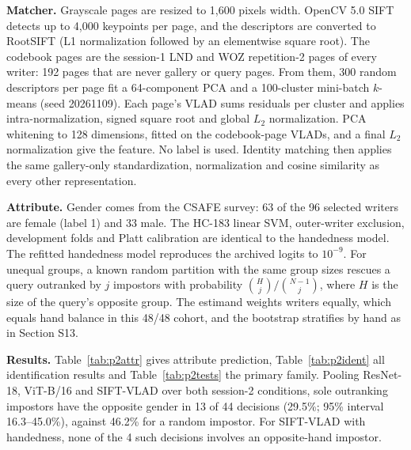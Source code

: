 \documentclass[10pt,a4paper]{article}
\begin{document}
\textbf{Matcher.} Grayscale pages are resized to 1,600 pixels width. OpenCV 5.0 SIFT detects up to 4,000 keypoints per page, and the descriptors are converted to RootSIFT (L1 normalization followed by an elementwise square root). The codebook pages are the session-1 LND and WOZ repetition-2 pages of every writer: 192 pages that are never gallery or query pages. From them, 300 random descriptors per page fit a 64-component PCA and a 100-cluster mini-batch $k$-means (seed 20261109). Each page's VLAD sums residuals per cluster and applies intra-normalization, signed square root and global $L_2$ normalization. PCA whitening to 128 dimensions, fitted on the codebook-page VLADs, and a final $L_2$ normalization give the feature. No label is used. Identity matching then applies the same gallery-only standardization, normalization and cosine similarity as every other representation.

\textbf{Attribute.} Gender comes from the CSAFE survey: 63 of the 96 selected writers are female (label 1) and 33 male. The HC-183 linear SVM, outer-writer exclusion, development folds and Platt calibration are identical to the handedness model. The refitted handedness model reproduces the archived logits to $10^{-9}$. For unequal groups, a known random partition with the same group sizes rescues a query outranked by $j$ impostors with probability $\binom{H}{j}/\binom{N-1}{j}$, where $H$ is the size of the query's opposite group. The estimand weights writers equally, which equals hand balance in this 48/48 cohort, and the bootstrap stratifies by hand as in Section S13.

\textbf{Results.} Table~\ref{tab:p2attr} gives attribute prediction, Table~\ref{tab:p2ident} all identification results and Table~\ref{tab:p2tests} the primary family. Pooling ResNet-18, ViT-B/16 and SIFT-VLAD over both session-2 conditions, sole outranking impostors have the opposite gender in 13 of 44 decisions (29.5\%; 95\% interval 16.3--45.0\%), against 46.2\% for a random impostor. For SIFT-VLAD with handedness, none of the 4 such decisions involves an opposite-hand impostor.
\end{document}
